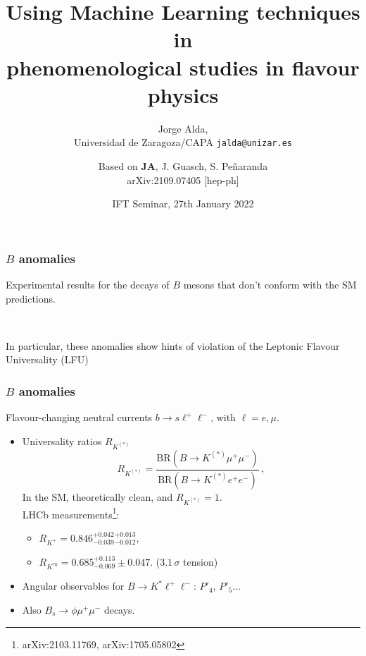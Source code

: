 \documentclass[mathserif, 10pt]{beamer}
\title[Using ML techniques in phenomenological studies in flavour physics]{Using Machine Learning techniques in\\ phenomenological studies in flavour physics}
\subtitle{Jorge Alda,\\ Universidad de Zaragoza/CAPA \hspace{4em} \texttt{jalda@unizar.es} }
\author[Jorge Alda]{Based on \textbf{JA}, J. Guasch, S. Peñaranda \\
arXiv:2109.07405 [hep-ph]}
\date[IFT Seminar]{IFT Seminar, 27th January 2022}
\begin{document}
\begin{frame}
\titlepage
\end{frame}

\begin{frame}
    \frametitle{$B$ anomalies}

    Experimental results for the decays of $B$ mesons that don't conform with the SM predictions.

    ~

    In particular, these anomalies show hints of violation of the Leptonic Flavour Universality (LFU)

\end{frame}

\begin{frame}
    \frametitle{$B$ anomalies}

    Flavour-changing neutral currents $b \to s \ell^+ \ell^-$, with $\ell = e, \mu$.
    \begin{itemize}
        \item Universality ratios $R_{K^{(*)}}$
              $$R_{K^{(*)}} = \frac{\mathrm{BR}(B\to K^{(*)}\mu^+ \mu^-)}{\mathrm{BR}(B\to K^{(*)}e^+ e^-)}\,, $$
              In the SM, theoretically clean, and $R_{K^{(*)}}=1$.\\
              LHCb measurements\footnote{arXiv:2103.11769, arXiv:1705.05802}:
              \begin{itemize}
                  \item $R_{K^+} = 0.846^{+0.042}_{-0.039}{}^{+0.013}_{-0.012}$,
                  \item $R_{K^{*0}} = 0.685^{+0.113}_{-0.069}\pm0.047$. ($3.1\,\sigma$ tension)
              \end{itemize}
        \item Angular observables for $B\to K^* \ell^+\ell^-$: $P'_4$, $P'_5$...
        \item Also $B_s \to \phi \mu^+ \mu^-$ decays.
    \end{itemize}

\end{frame}
\end{document}
